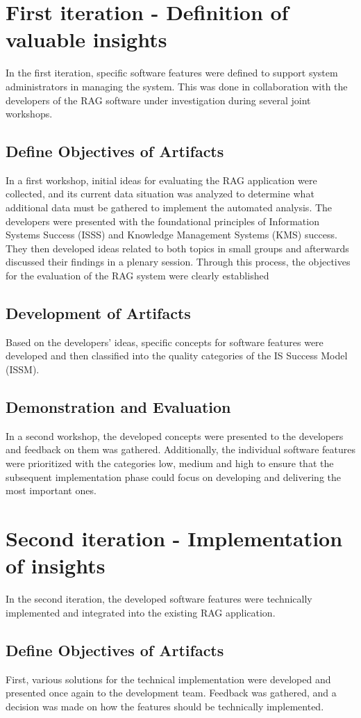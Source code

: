 \documentclass[
	english,
	ruledheaders=section,%
	class=report,%
	thesis={type=bachelor},%
	accentcolor=1b,%
	custommargins=true,%
	marginpar=false,%
	parskip=half-,%
	fontsize=11pt,%
	DIV=14,
]{tudapub}
\begin{document}
\section{First iteration - Definition of valuable insights}
In the first iteration, specific software features were defined to support system administrators in managing the system. This was done in collaboration with the developers of the RAG software under investigation during several joint workshops.
\subsection{Define Objectives of Artifacts}
In a first workshop, initial ideas for evaluating the RAG application were collected, and its current data situation was analyzed to determine what additional data must be gathered to implement the automated analysis. The developers were presented with the foundational principles of Information Systems Success (ISSS) and Knowledge Management Systems (KMS) success. They then developed ideas related to both topics in small groups and afterwards discussed their findings in a plenary session. Through this process, the objectives for the evaluation of the RAG system were clearly established
\subsection{Development of Artifacts}
Based on the developers' ideas, specific concepts for software features were developed and then classified into the quality categories of the IS Success Model (ISSM).
\subsection{Demonstration and Evaluation}
In a second workshop, the developed concepts were presented to the developers and feedback on them was gathered. Additionally, the individual software features were prioritized with the categories low, medium and high to ensure that the subsequent implementation phase could focus on developing and delivering the most important ones.
\section{Second iteration - Implementation of insights}
In the second iteration, the developed software features were technically implemented and integrated into the existing RAG application.
\subsection{Define Objectives of Artifacts}
First, various solutions for the technical implementation were developed and presented once again to the development team. Feedback was gathered, and a decision was made on how the features should be technically implemented.
\end{document}
